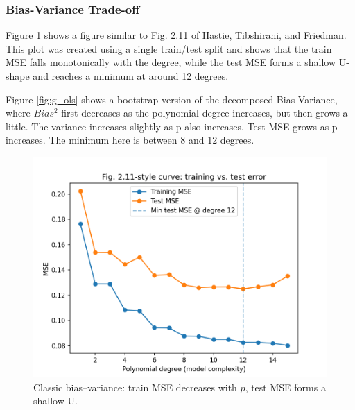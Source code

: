 \documentclass[amssymb,twocolumn,aps,floatfix]{revtex4-2}
\begin{document}
\subsubsection{Bias-Variance Trade-off}

Figure \ref{fig:fig2.11} shows a figure similar to Fig. 2.11 of Hastie, Tibshirani, and Friedman. This plot was created using a single train/test split and shows that the train MSE falls monotonically with the degree, while the test MSE forms a shallow U-shape and reaches a minimum at around 12 degrees. 

Figure \ref{fig:g_ols} shows a bootstrap version of the decomposed Bias-Variance, where $Bias^2$ first decreases as the polynomial degree increases, but then grows a little. The variance increases slightly as p also increases. Test MSE grows as p increases. The minimum here is between 8 and 12 degrees. 

\begin{figure}[t]
    \centering
    \includegraphics[width=1\linewidth]{Project-1/Figures/fig2.11_style.png}
    \caption{Classic bias–variance: train MSE decreases with $p$, test MSE forms a shallow U.  }
    \label{fig:fig2.11}
\end{figure}
\end{document}
